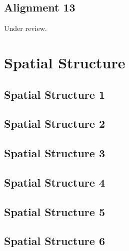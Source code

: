 \documentclass{scrartcl}
\begin{document}
\subsection{Alignment 13}
\label{sec:align_13}
Under review.%
\clearpage

\section{Spatial Structure}

\subsection{Spatial Structure 1}
\label{sec:spatial_1}
\clearpage

\subsection{Spatial Structure 2}
\label{sec:spatial_2}
\clearpage

\subsection{Spatial Structure 3}
\label{sec:spatial_3}
\clearpage

\subsection{Spatial Structure 4}
\label{sec:spatial_4}
\clearpage

\subsection{Spatial Structure 5}
\label{sec:spatial_5}
\clearpage

\subsection{Spatial Structure 6}
\label{sec:spatial_6}
\clearpage

\end{document}
